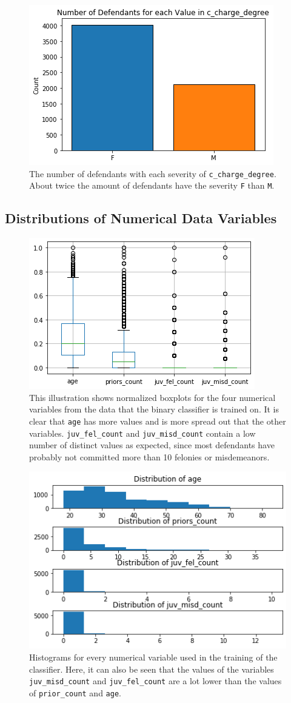 \documentclass[11pt, fleqn, titlepage]{article}
\begin{document}
	\begin{figure}[H]
		\centering
		\includegraphics[width=0.5\linewidth]{imgs/categorical_c_charge_degree}
		\caption{The number of defendants with each severity of \texttt{c\_charge\_degree}. About twice the amount of defendants have the severity \texttt{F} than \texttt{M}.}
		\label{fig:categoricalcchargedegree}
	\end{figure}
	
	
	\subsection{Distributions of Numerical Data Variables}\label{dist_numerical}
	\begin{figure}[H]
		\centering
		\includegraphics[width=0.5\linewidth]{imgs/boxplot_numericals}
		\caption{This illustration shows normalized boxplots for the four numerical variables from the data that the binary classifier is trained on. It is clear that \texttt{age} has more values and is more spread out that the other variables. \texttt{juv\_fel\_count} and \texttt{juv\_misd\_count} contain a low number of distinct values as expected, since most defendants have probably not committed more than 10 felonies or misdemeanors.}
		\label{fig:boxplotnumericals}
	\end{figure}
	\begin{figure}[H]
		\centering
		\includegraphics[width=0.5\linewidth]{imgs/histogram_numerical}
		\caption{Histograms for every numerical variable used in the training of the classifier. Here, it can also be seen that the values of the variables \texttt{juv\_misd\_count} and \texttt{juv\_fel\_count} are a lot lower than the values of \texttt{prior\_count} and \texttt{age}.}
		\label{fig:histogramnumerical}
	\end{figure}
	
\end{document}
